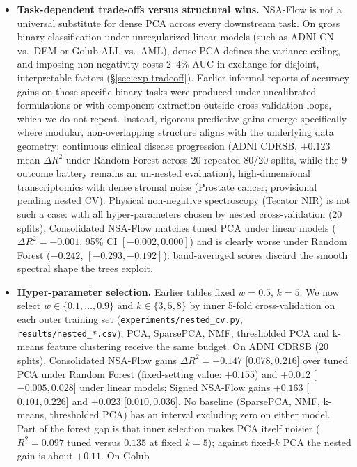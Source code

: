 \documentclass[11pt]{article}
\theoremstyle{definition}
\begin{document}
\begin{itemize}\itemsep2pt
\item \textbf{Task-dependent trade-offs versus structural wins.} NSA-Flow is
  not a universal substitute for dense PCA across every downstream task. On gross
  binary classification under unregularized linear models (such as ADNI CN vs.\ DEM
  or Golub ALL vs.\ AML), dense PCA defines the variance ceiling, and imposing
  non-negativity costs $2$--$4\%$ AUC in exchange for disjoint, interpretable
  factors (\S\ref{sec:exp-tradeoff}). Earlier informal reports of accuracy gains
  on those specific binary tasks were produced under uncalibrated formulations or
  with component extraction outside cross-validation loops, which we do not repeat.
  Instead, rigorous predictive gains emerge specifically where modular,
  non-overlapping structure aligns with the underlying data geometry: continuous
  clinical disease progression (ADNI CDRSB, $+0.123$ mean $\Delta R^2$ under Random
  Forest across 20 repeated 80/20 splits, while the 9-outcome battery remains an
  un-nested evaluation), high-dimensional transcriptomics with dense stromal noise
  (Prostate cancer; provisional pending nested CV). Physical non-negative
  spectroscopy (Tecator NIR) is not such a case: with all hyper-parameters chosen by
  nested cross-validation (20 splits), Consolidated NSA-Flow matches tuned PCA under
  linear models ($\Delta R^2=-0.001$, 95\% CI $[-0.002, 0.000]$) and is clearly worse
  under Random Forest ($-0.242$, $[-0.293,-0.192]$): band-averaged scores discard
  the smooth spectral shape the trees exploit.
\item \label{sec:nested}\textbf{Hyper-parameter selection.} Earlier tables fixed $w=0.5$, $k=5$.
  We now select $w\in\{0.1,\dots,0.9\}$ and $k\in\{3,5,8\}$ by inner 5-fold
  cross-validation on each outer training set (\texttt{experiments/nested\_cv.py},
  \texttt{results/nested\_*.csv}); PCA, SparsePCA, NMF, thresholded PCA and k-means
  feature clustering receive the same budget. On ADNI CDRSB (20 splits),
  Consolidated NSA-Flow gains $\Delta R^2=+0.147$ [$0.078, 0.216$] over tuned PCA
  under Random Forest (fixed-setting value: $+0.155$) and $+0.012$ [$-0.005,0.028$]
  under linear models; Signed NSA-Flow gains $+0.163$ [$0.101,0.226$] and $+0.023$
  [$0.010,0.036$]. No baseline (SparsePCA, NMF, k-means, thresholded PCA) has an
  interval excluding zero on either model. Part of the forest gap is that inner
  selection makes PCA itself noisier ($R^2=0.097$ tuned versus $0.135$ at fixed
  $k=5$); against fixed-$k$ PCA the nested gain is about $+0.11$. On Golub

\end{itemize}
\end{document}
